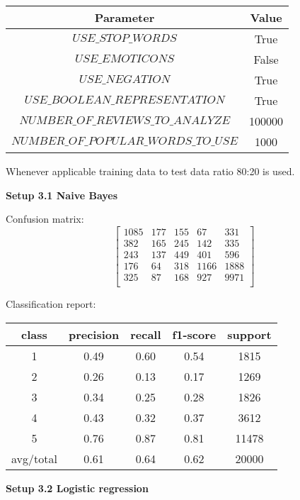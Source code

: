 \documentclass[12pt]{report}
\begin{document}
\begin{center}
	\begin{tabular}{ c | c }
		\hline
		Parameter & Value \\ \hline
		$USE\_STOP\_WORDS$ & True \\ \hline
		$USE\_EMOTICONS$ & False \\ \hline
		$USE\_NEGATION$ & True \\ \hline
		$USE\_BOOLEAN\_REPRESENTATION$ & True \\ \hline
		$NUMBER\_OF\_REVIEWS\_TO\_ANALYZE$ & 100000 \\ \hline
		$NUMBER\_OF\_POPULAR\_WORDS\_TO\_USE$ & 1000 \\ \hline
	\end{tabular}
\end{center}

Whenever applicable training data to test data ratio 80:20 is used.

\bigbreak

\textbf{Setup 3.1 Naive Bayes}

Confusion matrix:
\[
\begin{bmatrix}
1085 & 177 & 155 & 67 & 331 \\
382 & 165 & 245 & 142 & 335 \\
243 & 137 & 449 & 401 & 596 \\
176 & 64 & 318 & 1166 & 1888 \\
325 &  87 & 168 & 927 & 9971 \\
\end{bmatrix}
\]

Classification report:

\begin{center}
	\begin{tabular}{c | c | c | c | c }
		\hline
		class & precision & recall & f1-score & support \\ \hline
		1 & 0.49 & 0.60 & 0.54 & 1815 \\ \hline
		2 & 0.26 & 0.13 & 0.17 & 1269 \\ \hline
		3 & 0.34 & 0.25 & 0.28 & 1826 \\ \hline
		4 & 0.43 & 0.32 & 0.37 & 3612 \\ \hline
		5 & 0.76 & 0.87 & 0.81 & 11478 \\ \hline
		avg/total & 0.61 & 0.64 & 0.62 & 20000 \\ \hline
	\end{tabular}
\end{center}

\textbf{Setup 3.2 Logistic regression}
\end{document}
